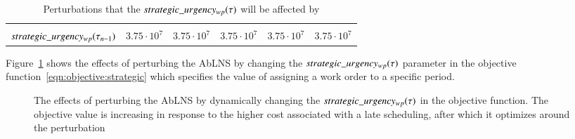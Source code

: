 \begin{table}[H]
\begin{tabular}{cccccc}
	\makecell{$ \ParStrategicUrgency[\VarMetaTime_{n}] -$\\ $\ParStrategicUrgency[\VarMetaTime_{n - 1}]$}        & $3.75 \cdot 10^{7}$                                           & $3.75 \cdot 10^{7}$                                            & $3.75 \cdot 10^{7}$                                            & $3.75 \cdot 10^{7}$                                            & $3.75 \cdot 10^{7}$                                       \\ \bottomrule
	\end{tabular}
	\caption{Perturbations that the $\ParStrategicUrgency$ will be affected by
	}\label{tab:responses:value_change}
\end{table}

Figure~\ref{fig:responses:value_change} shows the effects of
perturbing the AbLNS by changing the $\ParStrategicUrgency$ parameter in the objective
function~\ref{eqn:objective:strategic} which specifies the value of assigning a
work order to a specific period.

\begin{figure}[H]%
	\centering
	\resizebox{\linewidth}{!}{
		
	}
	\caption{The effects of perturbing the AbLNS by dynamically changing the
	$\ParStrategicUrgency$ in the objective function. The objective value
	is increasing in response to the higher cost associated with a late
	scheduling, after which it optimizes around the perturbation
	}\label{fig:responses:value_change}
\end{figure}
 
